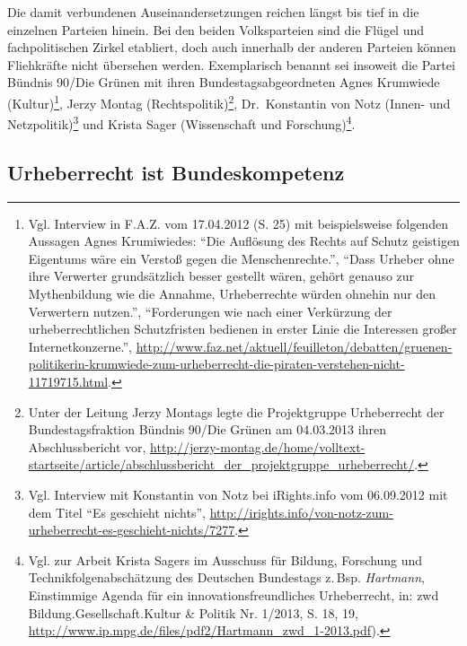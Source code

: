\documentclass[output=paper]{langscibook}
\begin{document}
Die damit verbundenen Auseinandersetzungen reichen längst bis tief in
die einzelnen Parteien hinein. Bei den beiden Volksparteien sind die
Flügel und fachpolitischen Zirkel etabliert, doch auch innerhalb der
anderen Parteien können Fliehkräfte nicht übersehen werden. Exemplarisch
benannt sei insoweit die Partei Bündnis 90/Die Grünen mit ihren
Bundestagsabgeordneten Agnes Krumwiede (Kultur)\footnote{Vgl. Interview
  in F.A.Z. vom 17.04.2012 (S. 25) mit beispielsweise folgenden Aussagen
  Agnes Krumiwiedes: \enquote{Die Auflösung des Rechts auf Schutz
  geistigen Eigentums wäre ein Verstoß gegen die Menschenrechte.},
  \enquote{Dass Urheber ohne ihre Verwerter grundsätzlich besser
  gestellt wären, gehört genauso zur Mythenbildung wie die Annahme,
  Urheberrechte würden ohnehin nur den Verwertern nutzen.},
  \enquote{Forderungen wie nach einer Verkürzung der urheberrechtlichen
  Schutzfristen bedienen in erster Linie die Interessen großer
  Internetkonzerne.},
  \url{http://www.faz.net/aktuell/feuilleton/debatten/gruenen-politikerin-krumwiede-zum-urheberrecht-die-piraten-verstehen-nicht-11719715.html}.},
Jerzy Montag (Rechtspolitik)\footnote{Unter der Leitung Jerzy Montags
  legte die Projektgruppe Urheberrecht der Bundestagsfraktion Bündnis
  90/Die Grünen am 04.03.2013 ihren Abschlussbericht vor,
  \url{http://jerzy-montag.de/home/volltext-startseite/article/abschlussbericht_der_projektgruppe_urheberrecht/}.},
Dr.~Konstantin von Notz (Innen- und Netzpolitik)\footnote{Vgl. Interview
  mit Konstantin von Notz bei iRights.info vom 06.09.2012 mit dem Titel
  \enquote{Es geschieht nichts},
  \url{http://irights.info/von-notz-zum-urheberrecht-es-geschieht-nichts/7277}.}
und Krista Sager (Wissenschaft und Forschung)\footnote{Vgl. zur Arbeit
  Krista Sagers im Ausschuss für Bildung, Forschung und
  Technikfolgenabschätzung des Deutschen Bundestags z.\,Bsp.
  \emph{Hartmann}, Einstimmige Agenda für ein innovationsfreundliches
  Urheberrecht, in: zwd Bildung.Gesellschaft.Kultur \& Politik Nr.
  1/2013, S. 18, 19,
  \url{http://www.ip.mpg.de/files/pdf2/Hartmann_zwd_1-2013.pdf}).}.

\hypertarget{urheberrecht-ist-bundeskompetenz}{%
\subsection{Urheberrecht ist
Bundeskompetenz}\label{urheberrecht-ist-bundeskompetenz}}
\end{document}
